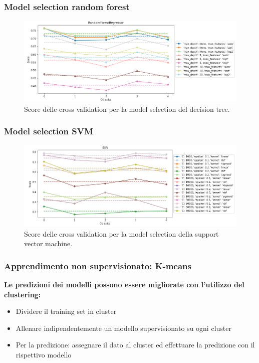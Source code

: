 \documentclass{beamer}
\begin{document}
\begin{frame}
	\frametitle{Model selection random forest}
	\begin{figure}[ht]
		\centering
		\includegraphics[width=\textwidth]{ranfcv.png}
		\caption{Score delle cross validation per la model selection del decision
		tree.}
	\end{figure}
\end{frame}

\begin{frame}
	\frametitle{Model selection SVM}
	\begin{figure}[ht]
		\centering
		\includegraphics[width=\textwidth]{svmcv.png}
		\caption{Score delle cross validation per la model selection della support
		vector machine.}
	\end{figure}
\end{frame}

\begin{frame}
	\frametitle{Apprendimento non supervisionato: K-means}
	\textbf{Le predizioni dei modelli possono essere migliorate con l'utilizzo
	del clustering:}
	\begin{itemize}
		\item Dividere il training set in cluster
		\item Allenare indipendentemente un modello supervisionato su ogni cluster
		\item Per la predizione: assegnare il dato al cluster ed effettuare la
			predizione con il rispettivo modello
	\end{itemize}
\end{frame}
\end{document}
